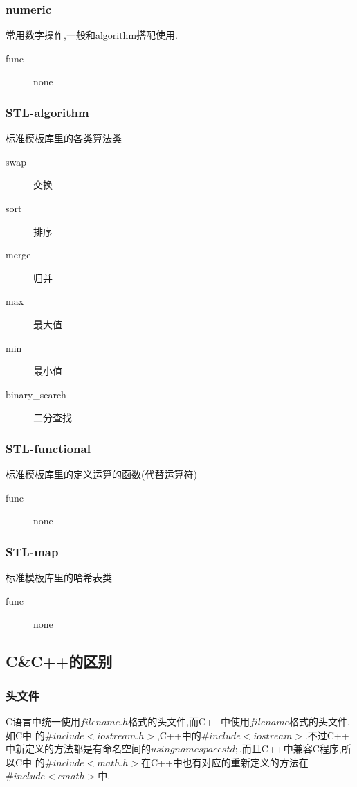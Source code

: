 \subsubsection{numeric}
常用数字操作,一般和algorithm搭配使用.
\begin{description}
\item[func]		none
\end{description}


\subsubsection{STL-algorithm}
标准模板库里的各类算法类
\begin{description}
\item[swap]		交换
\item[sort]		排序
\item[merge]		归并
\item[max]		最大值
\item[min]		最小值
\item[binary\_{}search]	二分查找
\end{description}


\subsubsection{STL-functional}
标准模板库里的定义运算的函数(代替运算符)
\begin{description}
\item[func]		none
\end{description}


\subsubsection{STL-map}
标准模板库里的哈希表类
\begin{description}
\item[func]		none
\end{description}

\subsection{C\&{}C++的区别}
\subsubsection{头文件}
C语言中统一使用$filename.h$格式的头文件,而C++中使用$filename$格式的头文件,如C中
的$\#include<iostream.h>$,C++中的$\#include<iostream>$.不过C++
中新定义的方法都是有命名空间的$using namespace std;$.而且C++中兼容C程序,所以C中
的$\#include<math.h>$在C++中也有对应的重新定义的方法在$\#include<cmath>$中.

